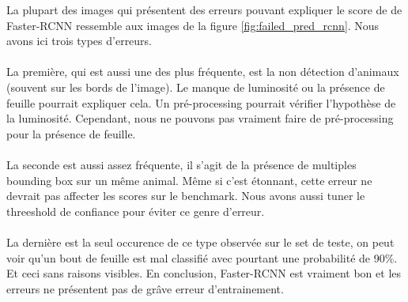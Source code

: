 La plupart des images qui présentent des erreurs pouvant expliquer le score de de Faster-RCNN ressemble aux images de la figure \ref{fig:failed_pred_rcnn}. 
Nous avons ici trois types d'erreurs. 
\paragraph{}
La première, qui est aussi une des plus fréquente, est la non détection d'animaux (souvent sur les bords de l'image). Le manque de luminosité ou la présence de feuille pourrait expliquer cela. Un pré-processing pourrait vérifier l'hypothèse de la luminosité. Cependant, nous ne pouvons pas vraiment faire de pré-processing pour la présence de feuille.
\paragraph{}
La seconde est aussi assez fréquente, il s'agit de la présence de multiples bounding box sur un même animal. Même si c'est étonnant, cette erreur ne devrait pas affecter les scores sur le benchmark. Nous avons aussi tuner le threeshold de confiance pour éviter ce genre d'erreur.
\paragraph{}
La dernière est la seul occurence de ce type observée sur le set de teste, on peut voir qu'un bout de feuille est mal classifié avec pourtant une probabilité de 90\%. Et ceci sans raisons visibles.
En conclusion, Faster-RCNN est vraiment bon et les erreurs ne présentent pas de grâve erreur d'entrainement.

